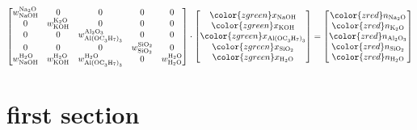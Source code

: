 \documentclass[amsmath,
               amssymb,
               superscriptaddress,
               aps,
               floats,
               showkeys,
               notitlepage, %
               ]{revtex4-1}
\begin{document}
$$
\begin{bmatrix}
w^{\textrm{Na}_2\textrm{O}}_{\textrm{NaOH}} & 0 & 0 & 0 & 0 \\
0 & w^{\textrm{K}_2\textrm{O}}_{\textrm{KOH}} & 0 & 0 & 0 \\
0 & 0 & w^{\textrm{Al}_{2}\textrm{O}_{3}}_{\textrm{Al(OC}_{3}\textrm{H}_{7}\textrm{)}_{3}} & 0 & 0\\
0 & 0 & 0 & w^{\textrm{SiO}_{2}}_{\textrm{SiO}_{2}} & 0 \\
w^{\textrm{H}_2\textrm{O}}_{\textrm{NaOH}} & w^{\textrm{H}_2\textrm{O}}_{\textrm{KOH}} & w^{\textrm{H}_{2}\textrm{O}}_{\textrm{Al(OC}_{3}\textrm{H}_{7}\textrm{)}_{3}} & 0 & w^{\textrm{H}_2\textrm{O}}_{\textrm{H}_2\textrm{O}}\\
\end{bmatrix}
\cdot
\begin{bmatrix}
{\color{zgreen}x_{\textrm{NaOH}}} \\
{\color{zgreen}x_{\textrm{KOH}}} \\
{\color{zgreen}x_{\textrm{Al(OC}_{3}\textrm{H}_{7}\textrm{)}_{3}}} \\
{\color{zgreen}x_{\textrm{SiO}_{2}}} \\
{\color{zgreen}x_{\textrm{H}_2\textrm{O}}} \\
\end{bmatrix}
=
\begin{bmatrix}
{\color{zred}n_{\textrm{Na}_2\textrm{O}}} \\
{\color{zred}n_{\textrm{K}_2\textrm{O}}} \\
{\color{zred}n_{\textrm{Al}_{2}\textrm{O}_{3}}} \\
{\color{zred}n_{\textrm{SiO}_{2}}} \\
{\color{zred}n_{\textrm{H}_2\textrm{O}}} \\
\end{bmatrix}
$$

\section{first section}
\end{document}
